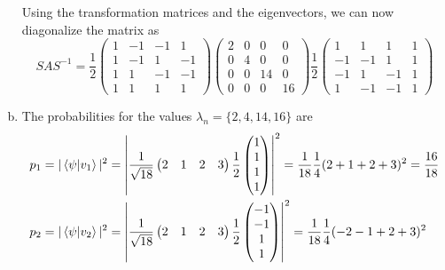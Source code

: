 \documentclass[a4paper,german,12pt,smallheadings]{scrartcl}
\begin{document}
\begin{enumerate}[a)]
    Using the transformation matrices and the eigenvectors, we can now diagonalize the matrix as
    \begin{equation*}
      SAS^{-1} =
      \frac{1}{2}
      \begin{pmatrix}
        1 & -1 & -1 & 1 \\
        1 & -1 & 1 & -1 \\
        1 & 1 & -1 & -1 \\
        1 & 1 & 1 & 1
      \end{pmatrix}
      \begin{pmatrix}
        2 & 0 & 0 & 0 \\
        0 & 4 & 0 & 0 \\
        0 & 0 & 14 & 0 \\
        0 & 0 & 0 & 16
      \end{pmatrix}
      \frac{1}{2}\begin{pmatrix}
         1 &  1 &  1 & 1 \\
        -1 & -1 &  1 & 1 \\
        -1 &  1 & -1 & 1 \\
         1 & -1 & -1 & 1
      \end{pmatrix}
    \end{equation*}
  \item
    The probabilities for the values $\lambda_n = \{2, 4, 14, 16\}$ are
    \begin{align*}
      &p_1
      = |\braket{\psi|v_1}|^2
      = \left| \frac{1}{\sqrt{18}}
        \begin{pmatrix} 2 & 1 & 2 & 3 \end{pmatrix}
         \frac{1}{2} \begin{pmatrix}1 \\ 1 \\ 1 \\ 1\end{pmatrix} \right|^2
      = \frac{1}{18} \frac{1}{4} (2+1+2+3)^2
      = \frac{16}{18} \\
      &p_2
      = |\braket{\psi|v_2}|^2
      = \left| \frac{1}{\sqrt{18}}
        \begin{pmatrix} 2 & 1 & 2 & 3 \end{pmatrix}
         \frac{1}{2} \begin{pmatrix}-1 \\ -1 \\ 1 \\ 1\end{pmatrix} \right|^2
      = \frac{1}{18} \frac{1}{4} (-2-1+2+3)^2

\end{align*}
\end{enumerate}
\end{document}
